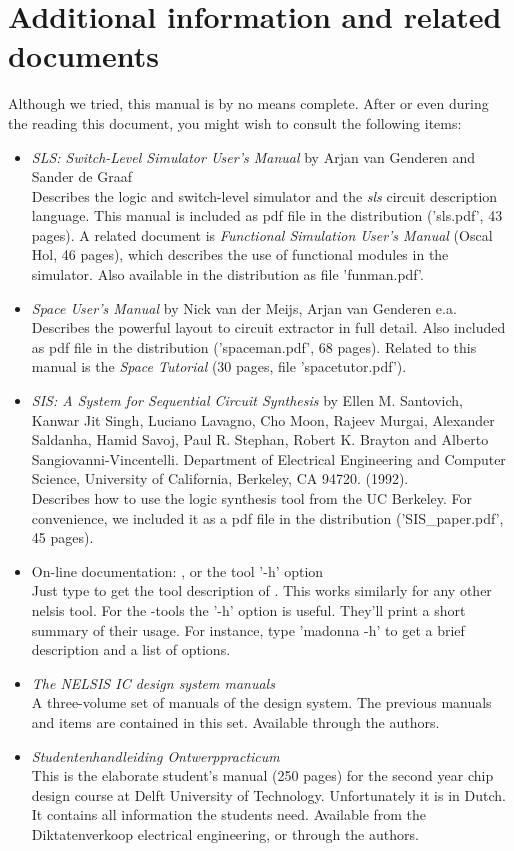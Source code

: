 \section{Additional information and related documents}
Although we tried, this manual is by no means complete. After or even during
the reading this document, you might wish to consult the following items:
\begin{itemize}
\item
{\em SLS: Switch-Level Simulator User's Manual} by Arjan van Genderen and
Sander de Graaf\\
Describes the logic and switch-level simulator  and the {\sl sls}
circuit description language. This manual is included as pdf file in the
distribution ('sls.pdf', 43 pages).
A related document is {\sl Functional Simulation User's Manual} (Oscal Hol, 46 pages),
which describes the use of functional modules in the  simulator. Also
available in the distribution as file 'funman.pdf'.
\item
{\em Space User's Manual} by Nick van der Meijs, Arjan van Genderen e.a.\\
Describes the powerful layout to circuit extractor  in full detail.
Also included as pdf file in the distribution ('spaceman.pdf', 68 pages).
Related to this manual is the {\sl Space Tutorial} (30 pages, file 'spacetutor.pdf').
\item {\em SIS: A System for Sequential Circuit Synthesis} 
by Ellen M. Santovich, Kanwar Jit Singh, Luciano Lavagno, Cho Moon, Rajeev
Murgai, Alexander Saldanha, Hamid Savoj, Paul R. Stephan, Robert K. Brayton and
Alberto Sangiovanni-Vincentelli.  Department of Electrical Engineering and
Computer Science, University of California, Berkeley, CA 94720. (1992).\\
Describes how to use the  logic synthesis tool from the UC Berkeley.
For convenience, we included it as a pdf file in the distribution ('SIS\_paper.pdf', 45 pages).
\item
On-line documentation: , 
or the tool '-h' option\\
Just type  to get the tool
description of . This works similarly for any other nelsis tool.
For the -tools the '-h' option is useful. They'll print a short
summary of their usage. For instance, type 'madonna -h' to get a brief
description and a list of options.
\item
{\em The NELSIS IC design system
manuals}\\ A three-volume set of manuals of the  design system. The
previous manuals and items are contained in this set.  Available through the
authors.
\item
{\em Studentenhandleiding Ontwerppracticum}\\
This is the elaborate student's
manual (250 pages) for the second year chip design course at Delft University of
Technology.  Unfortunately it is in Dutch. It contains all information the
students need. Available from the Diktatenverkoop electrical engineering, or
through the authors.
\end{itemize}

